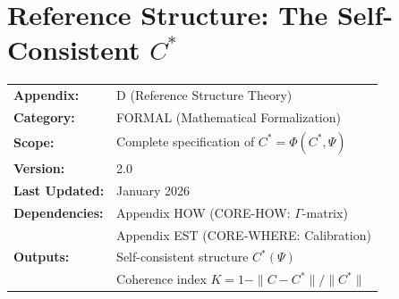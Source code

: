 \section{Reference Structure: The Self-Consistent $C^*$}
\label{app:formal-cstar}



\begin{tcolorbox}[colback=blue!5!white, colframe=blue!75!black,
    title=\textbf{Appendix PRF: FORMAL-CSTAR}]

\begin{tabular}{@{}ll@{}}
\textbf{Appendix:} & D (Reference Structure Theory) \\
\textbf{Category:} & FORMAL (Mathematical Formalization) \\
\textbf{Scope:} & Complete specification of $C^* = \Phi(C^*, \Psi)$ \\
\textbf{Version:} & 2.0 \\
\textbf{Last Updated:} & January 2026 \\
\textbf{Dependencies:} & Appendix HOW (CORE-HOW: $\Gamma$-matrix) \\
                       & Appendix EST (CORE-WHERE: Calibration) \\
\textbf{Outputs:} & Self-consistent structure $C^*(\Psi)$ \\
                  & Coherence index $K = 1 - \|C - C^*\|/\|C^*\|$ \\
\end{tabular}

\end{tcolorbox}


